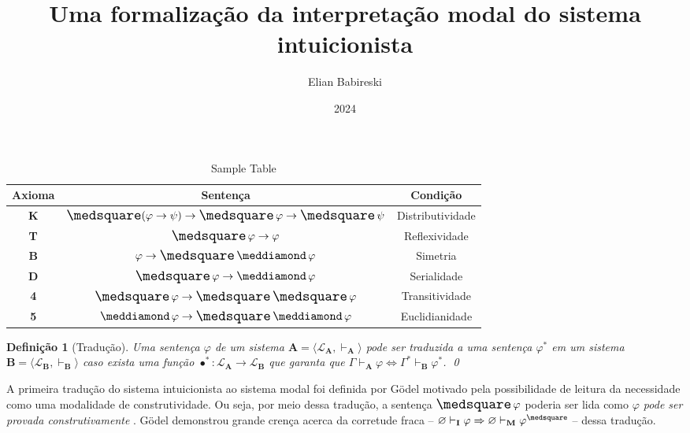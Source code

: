 \documentclass{report}
\newtheorem{definition}{Definição}
\begin{document}
    \title{Uma formalização da interpretação modal do sistema intuicionista}
    \author{Elian Babireski}
    \date{2024}

    \maketitle


    \begin{table}[h]
        \centering
        \begin{tabular}{|c|c|c|}
            \hline
            \textbf{Axioma} & \textbf{Sentença}                                       & \textbf{Condição} \\ \hline
            \textbf{K}      & $\nec(\varphi \to \psi) \to \nec \varphi \to \nec \psi$ & Distributividade  \\ \hline
            \textbf{T}      & $\nec \varphi \to \varphi$                              & Reflexividade     \\ \hline
            \textbf{B}      & $\varphi \to \nec \pos \varphi$                         & Simetria          \\ \hline
            \textbf{D}      & $\nec \varphi \to \pos \varphi$                         & Serialidade       \\ \hline
            \textbf{4}      & $\nec \varphi \to \nec \nec \varphi$                    & Transitividade    \\ \hline
            \textbf{5}      & $\pos \varphi \to \nec \pos \varphi$                    & Euclidianidade    \\ \hline
        \end{tabular}
        \caption{Sample Table}
        \label{tab:sample_table}
    \end{table}

    \begin{definition}[Tradução] 
        Uma sentença $\varphi$ de um sistema $\mathbf{A} = \langle \mathcal{L}_\mathbf{A}, \vdash_\mathbf{A}\rangle$ pode ser traduzida a uma sentença $\varphi^*$ em um sistema $\mathbf{B} = \langle \mathcal{L}_\mathbf{B}, \vdash_\mathbf{B} \rangle$ caso exista uma função $\bullet^* : \mathcal{L}_\mathbf{A} \to \mathcal{L}_\mathbf{B}$ que garanta que $\Gamma \vdash_\mathbf{A} \varphi \Leftrightarrow \Gamma^* \vdash_\mathbf{B} \varphi^*$.
        \qed
    \end{definition}

    A primeira tradução do sistema intuicionista ao sistema modal foi definida por Gödel \cite{Gödel} motivado pela possibilidade de leitura da necessidade como uma modalidade de construtividade. Ou seja, por meio dessa tradução, a sentença $\nec \varphi$ poderia ser lida como \textit{$\varphi$ pode ser provada construtivamente} \cite{Troelstra}. Gödel demonstrou grande crença acerca da corretude fraca -- $ \varnothing \vdash_\mathbf{I} \varphi \Rightarrow \varnothing \vdash_\mathbf{M} \varphi^\medsquare $ -- dessa tradução.
\end{document}
